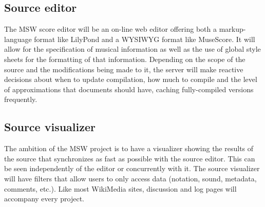 \documentclass{article}
\begin{document}
\subsection{Source editor}
The MSW score editor will be an on-line web editor offering both a
markup-language format like LilyPond and a WYSIWYG format like MuseScore.
It will allow for the specification of musical information as well as the
use of global style sheets for the formatting of that information.  Depending
on the scope of the source and the modifications being made to it, the
server will make reactive decisions about when to update compilation, how
much to compile and the level of approximations that documents should have,
caching fully-compiled versions frequently.
\subsection{Source visualizer}
The ambition of the MSW project is to have a visualizer showing the results
of the source that synchronizes as fast as possible with the source editor.
This can be seen independently of the editor or concurrently with it. The
source visualizer will have filters that allow users to only access
data (notation, sound, metadata, comments, etc.). Like most WikiMedia sites,
discussion and log pages will accompany every project.
\end{document}
